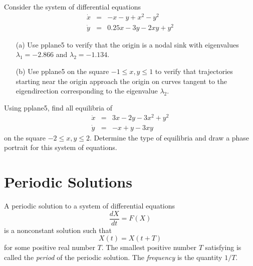 \documentclass{ximera}
\begin{document}
\begin{exercise} \label{c8.2.11}
Consider the system of differential equations 
\begin{equation*}
\begin{array}{rcl}
\dot{x} & = & -x - y + x^2 - y^2\\
\dot{y} & = & 0.25x - 3y - 2xy + y^2
\end{array}
\end{equation*}
\begin{itemize}
\item[(a)] Use {\sf pplane5} to verify that the origin is a nodal
sink with 
eigenvalues $\lambda_1=-2.866$ and $\lambda_2=-1.134$.
\item[(b)] Use {\sf pplane5} on the square $-1\leq x,y \leq 1$ to 
verify that trajectories starting near the origin approach the 
origin on curves tangent to the eigendirection 
corresponding to the eigenvalue $\lambda_2$.
\end{itemize}
\end{exercise}

\begin{exercise} \label{c8.2.12}
Using {\sf pplane5}, find all equilibria of 
\begin{equation*}
\begin{array}{rcl}
\dot{x} & = & 3x-2y-3x^2+y^2 \\
\dot{y} & = & -x+y-3xy
\end{array}
\end{equation*}
on the square $-2\leq x,y \leq 2$.  Determine the type of 
equilibria and draw a phase portrait for this system of equations. 
\end{exercise}

\section{Periodic Solutions} \label{S:periodic}

A periodic solution to a system of differential equations 
\begin{equation}  \label{e:genlveceqn}  
\frac{dX}{dt} = F(X)
\end{equation}
is a nonconstant solution such that 
\begin{equation}  \label{e:period}
X(t)=X(t+T)
\end{equation}
for some positive real number $T$.  The smallest positive number $T$
satisfying  is called the {\em period\/} 
of the periodic solution.  The {\em frequency\/} is 
the quantity $1/T$.
 
\end{document}
